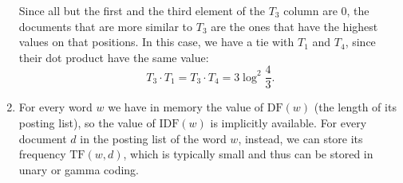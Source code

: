 \begin{enumerate}
  Since all but the first and the third element of the $T_3$ column are 0, the
  documents that are more similar to $T_3$ are the ones that have the highest
  values on that positions. In this case, we have a tie with $T_1$ and $T_4$,
  since their dot product have the same value: $$ T_3 \cdot T_1 = T_3 \cdot T_4
  = 3\log^2\frac{4}{3}.$$

  \item For every word $w$ we have in memory the value of $\text{DF}(w)$ (the
  length of its posting list), so the value of $\text{IDF}(w)$ is implicitly
  available. For every document $d$ in the posting list of the word $w$,
  instead, we can store its frequency $\text{TF}(w, d)$, which is typically
  small and thus can be stored in unary or gamma coding.

\end{enumerate}
